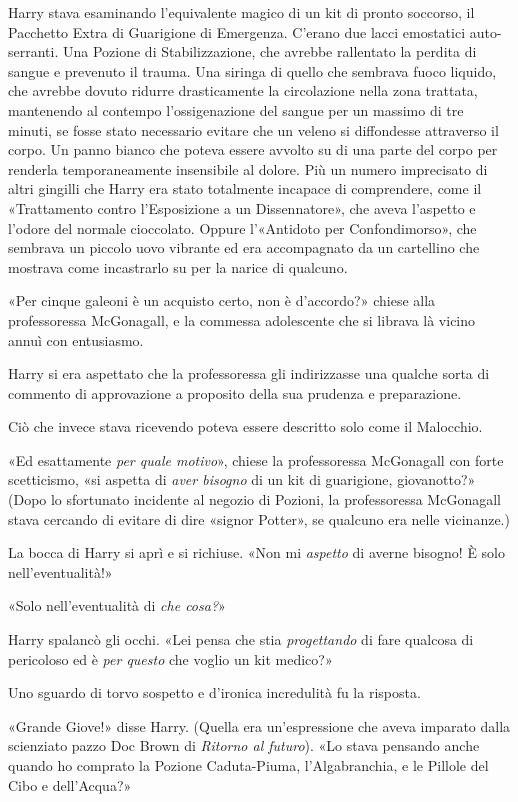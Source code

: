 Harry stava esaminando l’equivalente magico di un kit di pronto soccorso, il Pacchetto Extra di Guarigione di Emergenza. C’erano due lacci emostatici auto-serranti. Una Pozione di Stabilizzazione, che avrebbe rallentato la perdita di sangue e prevenuto il trauma. Una siringa di quello che sembrava fuoco liquido, che avrebbe dovuto ridurre drasticamente la circolazione nella zona trattata, mantenendo al contempo l’ossigenazione del sangue per un massimo di tre minuti, se fosse stato necessario evitare che un veleno si diffondesse attraverso il corpo. Un panno bianco che poteva essere avvolto su di una parte del corpo per renderla temporaneamente insensibile al dolore. Più un numero imprecisato di altri gingilli che Harry era stato totalmente incapace di comprendere, come il «Trattamento contro l’Esposizione a un Dissennatore», che aveva l’aspetto e l’odore del normale cioccolato. Oppure l’«Antidoto per Confondimorso», che sembrava un piccolo uovo vibrante ed era accompagnato da un cartellino che mostrava come incastrarlo su per la narice di qualcuno.

«Per cinque galeoni è un acquisto certo, non è d’accordo?» chiese alla professoressa McGonagall, e la commessa adolescente che si librava là vicino annuì con entusiasmo.

Harry si era aspettato che la professoressa gli indirizzasse una qualche sorta di commento di approvazione a proposito della sua prudenza e preparazione.

Ciò che invece stava ricevendo poteva essere descritto solo come il Malocchio.

«Ed esattamente \textit{per quale motivo}», chiese la professoressa McGonagall con forte scetticismo, «si aspetta di \textit{aver bisogno} di un kit di guarigione, giovanotto?» (Dopo lo sfortunato incidente al negozio di Pozioni, la professoressa McGonagall stava cercando di evitare di dire «signor Potter», se qualcuno era nelle vicinanze.)

La bocca di Harry si aprì e si richiuse. «Non mi \textit{aspetto} di averne bisogno! È solo nell’eventualità!»

«Solo nell’eventualità di \textit{che cosa?}»

Harry spalancò gli occhi. «Lei pensa che stia \textit{progettando} di fare qualcosa di pericoloso ed è \textit{per questo} che voglio un kit medico?»

Uno sguardo di torvo sospetto e d’ironica incredulità fu la risposta.

«Grande Giove!» disse Harry. (Quella era un’espressione che aveva imparato dalla scienziato pazzo Doc Brown di \textit{Ritorno al futuro}). «Lo stava pensando anche quando ho comprato la Pozione Caduta-Piuma, l’Algabranchia, e le Pillole del Cibo e dell’Acqua?»

